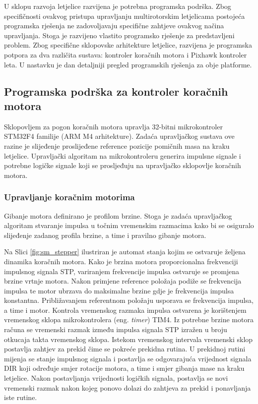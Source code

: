 \documentclass[11pt,a4paper]{article}
\begin{document}
	
U sklopu razvoja letjelice razvijena je potrebna programska podrška. Zbog specifičnosti ovakvog pristupa upravljanju multirotorskim letjelicama postojeća programska rješenja ne zadovoljavaju specifične zahtjeve ovakvog načina upravljanja. Stoga je razvijeno vlastito programsko rješenje za predstavljeni problem. Zbog specifične sklopovske arhitekture letjelice, razvijena je programska potpora za dva različita sustava: kontroler koračnih motora i Pixhawk kontroler leta. U nastavku je dan detaljniji pregled programskih rješenja za  obje platforme. 


\subsection{Programska podrška za kontroler koračnih motora}

Sklopovljem za pogon koračnih motora upravlja 32-bitni mikrokontroler STM32F4 familije (ARM M4 arhitekture). Zadaća upravljačkog sustava ove razine je
slijeđenje proslijeđene reference pozicije pomičnih masa na kraku letjelice. Upravljački algoritam na mikrokontroleru generira impulsne signale i potrebne logičke signale koji se prosljeđuju na upravljačko sklopovlje koračnih motora. \newline

\subsubsection{Upravljanje koračnim motorima}
Gibanje motora definirano je profilom brzine. Stoga je zadaća upravljačkog algoritam stvaranje impulsa u točnim vremenskim razmacima kako bi se osiguralo slijeđenje zadanog profila brzine, a time i pravilno gibanje motora.

Na Slici \ref{fig:sm_stepper} ilustriran je automat stanja kojim se ostvaruje željena dinamika koračnih motora. Kako je brzina motora proporcionalna 
frekvenciji impulsnog signala STP, variranjem frekvencije impulsa ostvaruje se promjena brzine vrtnje motora. Nakon primjene reference položaja podiže se frekvencija impulsa te motor ubrzava do maksimalne brzine gdje je frekvencija impulsa konstantna. Približavanjem referentnom položaju usporava se frekvencija impulsa, a time i motor. \newline
Kontrola vremenskog razmaka impulsa ostvarena je korištenjem vremenskog sklopa mikrokontrolera (eng. \textit{timer}) TIM4. Iz potrebne brzine motora računa se vremenski razmak između impulsa signala STP izražen u broju otkucaja takta vremenskog sklopa. Istekom vremenskog intervala vremenski sklop postavlja zahtjev za prekid čime se pokreće prekidna rutina. U prekidnoj rutini mijenja se stanje impulsnog signala i postavlja se odgovarajuća vrijednost signala DIR koji određuje smjer rotacije motora, a time i smjer gibanja mase na kraku letjelice. Nakon postavljanja vrijednosti logičkih signala, postavlja se novi vremenski razmak nakon kojeg ponovo dolazi do zahtjeva za prekid i ponavljanja iste rutine.
\end{document}
